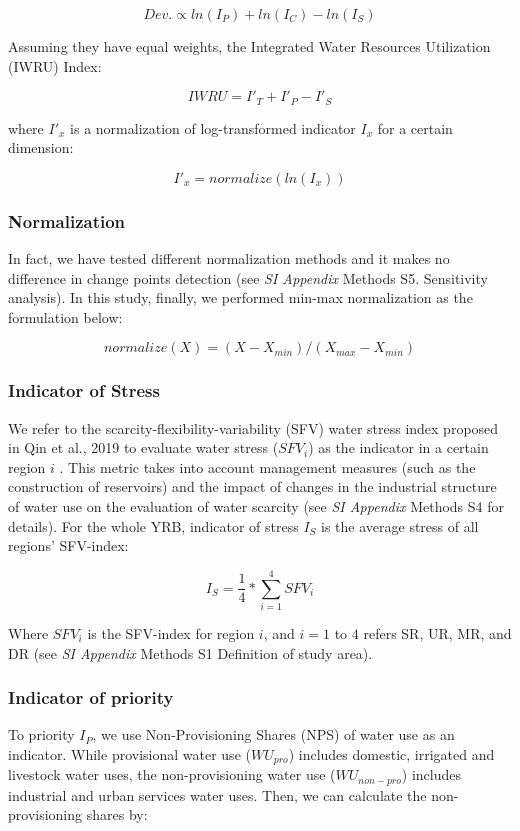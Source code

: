 \documentclass[9pt, twocolumn, twoside, lineno]{pnas-new}
\begin{document}
{	$$ Dev. \propto ln(I_P) + ln(I_C) - ln(I_S) $$

	Assuming they have equal weights, the Integrated Water Resources Utilization (IWRU) Index:

	$$ IWRU = I'_T + I'_P - I'_S $$

	where $I'_x$ is a normalization of log-transformed indicator $I_x$ for a certain dimension:

	$$ I'_x = normalize(ln(I_x)) $$
	
	\subsubsection*{Normalization}
	In fact, we have tested different normalization methods and it makes no difference in change points detection (see \textit{SI Appendix} Methods S5. Sensitivity analysis). In this study, finally, we performed min-max normalization as the formulation below:

	$$ normalize(X) = (X - X_{min}) / (X_{max} - X_{min}) $$

	\subsubsection*{Indicator of Stress}
	We refer to the scarcity-flexibility-variability (SFV) water stress index proposed in Qin et al., 2019 to evaluate water stress ($SFV_i$) as the indicator in a certain region $i$ \cite{qinFlexibilityIntensityGlobal2019}. This metric takes into account management measures (such as the construction of reservoirs) and the impact of changes in the industrial structure of water use on the evaluation of water scarcity (see \textit{SI Appendix} Methods S4 for details). For the whole YRB, indicator of stress $I_S$ is the average stress of all regions' SFV-index: 

	$$ I_S = \frac{1}{4} * \sum_{i=1}^4 SFV_{i} $$
	
	Where $SFV_i$ is the SFV-index for region $i$, and $i=1$ to $4$ refers SR, UR, MR, and DR (see \textit{SI Appendix} Methods S1 Definition of study area).

	\subsubsection*{Indicator of priority}
	To priority $I_P$, we use Non-Provisioning Shares (NPS) of water use as an indicator. While provisional water use ($WU_{pro}$) includes domestic, irrigated and livestock water uses, the non-provisioning water use ($WU_{non-pro}$) includes industrial and urban services water uses. Then, we can calculate the non-provisioning shares by:

}
\end{document}

